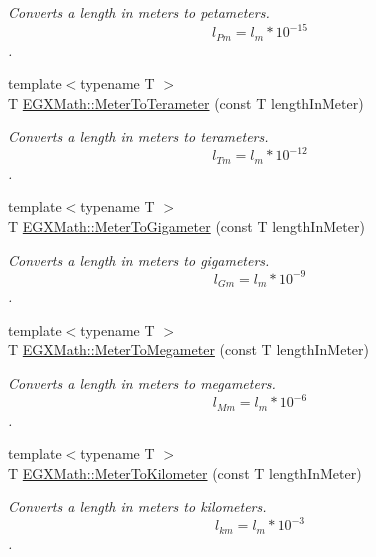 \begin{DoxyCompactItemize}
\begin{DoxyCompactList}\small\item\em Converts a length in meters to petameters. \[ l_{Pm}=l_{m} * 10^{-15} \]. \end{DoxyCompactList}\item 
{\footnotesize template$<$typename T $>$ }\\T \mbox{\hyperlink{group___e_g_x_math-_conversions-_length_conversions-_s_i-_meter-_s_i_gac4c21d00b7d8e8fc1c9e354f77bf94b2}{E\+G\+X\+Math\+::\+Meter\+To\+Terameter}} (const T length\+In\+Meter)
\begin{DoxyCompactList}\small\item\em Converts a length in meters to terameters. \[ l_{Tm}=l_{m} * 10^{-12} \]. \end{DoxyCompactList}\item 
{\footnotesize template$<$typename T $>$ }\\T \mbox{\hyperlink{group___e_g_x_math-_conversions-_length_conversions-_s_i-_meter-_s_i_ga045300d4eccd668680eab86f9262cc81}{E\+G\+X\+Math\+::\+Meter\+To\+Gigameter}} (const T length\+In\+Meter)
\begin{DoxyCompactList}\small\item\em Converts a length in meters to gigameters. \[ l_{Gm}=l_{m} * 10^{-9} \]. \end{DoxyCompactList}\item 
{\footnotesize template$<$typename T $>$ }\\T \mbox{\hyperlink{group___e_g_x_math-_conversions-_length_conversions-_s_i-_meter-_s_i_ga738fd2590049b1c2ae6ef2ecad9ed7f9}{E\+G\+X\+Math\+::\+Meter\+To\+Megameter}} (const T length\+In\+Meter)
\begin{DoxyCompactList}\small\item\em Converts a length in meters to megameters. \[ l_{Mm}=l_{m} * 10^{-6} \]. \end{DoxyCompactList}\item 
{\footnotesize template$<$typename T $>$ }\\T \mbox{\hyperlink{group___e_g_x_math-_conversions-_length_conversions-_s_i-_meter-_s_i_ga31b34ce8172d5b2401deb27db4ed6ece}{E\+G\+X\+Math\+::\+Meter\+To\+Kilometer}} (const T length\+In\+Meter)
\begin{DoxyCompactList}\small\item\em Converts a length in meters to kilometers. \[ l_{km}=l_{m} * 10^{-3} \]. \end{DoxyCompactList}\item 

\end{DoxyCompactItemize}
